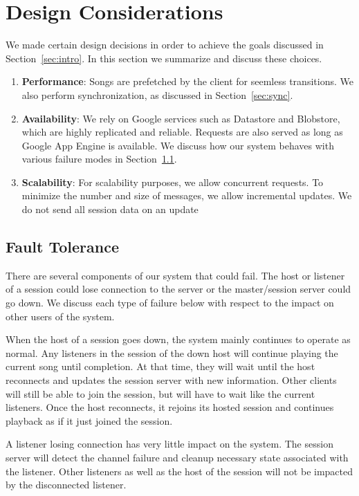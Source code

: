 \section{Design Considerations}
\label{sec:considerations}
We made certain design decisions in order to achieve the goals discussed
in Section~\ref{sec:intro}. In this section we summarize and discuss these choices.
\begin{enumerate}
  \item \textbf{Performance}: Songs are prefetched by the client for seemless transitions. 
  		We also perform synchronization, as discussed in Section~\ref{sec:sync}.
  \item \textbf{Availability}: We rely on Google services such as 
  		Datastore and Blobstore, which are highly replicated and reliable. Requests are
  		also served as long as Google App Engine is available. We discuss how our system
		behaves with various failure modes in Section~\ref{sec:faultTolerance}.
  \item \textbf{Scalability}: For scalability purposes, we allow concurrent requests.
  		To minimize the number and size of messages, we allow incremental
  		updates. We do not send all session data on an update
\end{enumerate}

\subsection{Fault Tolerance}
\label{sec:faultTolerance}
There are several components of our system that could fail. The host or listener
of a session could lose connection to the server or the master/session server
could go down. We discuss each type of
failure below with respect to the impact on other users of the system.

When the host of a session goes down, the system mainly continues
to operate as normal. Any listeners in the session of the down host
will continue playing the current song until completion. At that
time, they will wait until the host reconnects and updates the
session server with new information. Other clients will still be
able to join the session, but will have to wait like the current
listeners. Once the host reconnects, it rejoins its hosted session
and continues playback as if it just joined the session.

A listener losing connection has very little impact on the system. The session
server will detect the channel failure and cleanup necessary state
associated with the listener. Other listeners as well as the host
of the session will not be impacted by the disconnected listener.


